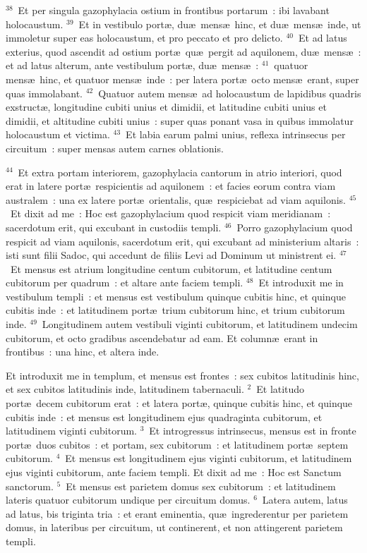 ${}^{38}$~Et per singula gazophylacia ostium in frontibus portarum~: ibi lavabant holocaustum.
${}^{39}$~Et in vestibulo port\ae , du\ae\ mens\ae\ hinc, et du\ae\ mens\ae\ inde, ut immoletur super eas holocaustum, et pro peccato et pro delicto.
${}^{40}$~Et ad latus exterius, quod ascendit ad ostium port\ae\ qu\ae\ pergit ad aquilonem, du\ae\ mens\ae~: et ad latus alterum, ante vestibulum port\ae , du\ae\ mens\ae~:
${}^{41}$~quatuor mens\ae\ hinc, et quatuor mens\ae\ inde~: per latera port\ae\ octo mens\ae\ erant, super quas immolabant.
${}^{42}$~Quatuor autem mens\ae\ ad holocaustum de lapidibus quadris exstruct\ae , longitudine cubiti unius et dimidii, et latitudine cubiti unius et dimidii, et altitudine cubiti unius~: super quas ponant vasa in quibus immolatur holocaustum et victima.
${}^{43}$~Et labia earum palmi unius, reflexa intrinsecus per circuitum~: super mensas autem carnes oblationis.


${}^{44}$~Et extra portam interiorem, gazophylacia cantorum in atrio interiori, quod erat in latere port\ae\ respicientis ad aquilonem~: et facies eorum contra viam australem~: una ex latere port\ae\ orientalis, qu\ae\ respiciebat ad viam aquilonis.
${}^{45}$~Et dixit ad me~: Hoc est gazophylacium quod respicit viam meridianam~: sacerdotum erit, qui excubant in custodiis templi.
${}^{46}$~Porro gazophylacium quod respicit ad viam aquilonis, sacerdotum erit, qui excubant ad ministerium altaris~: isti sunt filii Sadoc, qui accedunt de filiis Levi ad Dominum ut ministrent ei.
${}^{47}$~Et mensus est atrium longitudine centum cubitorum, et latitudine centum cubitorum per quadrum~: et altare ante faciem templi.
${}^{48}$~Et introduxit me in vestibulum templi~: et mensus est vestibulum quinque cubitis hinc, et quinque cubitis inde~: et latitudinem port\ae\ trium cubitorum hinc, et trium cubitorum inde.
${}^{49}$~Longitudinem autem vestibuli viginti cubitorum, et latitudinem undecim cubitorum, et octo gradibus ascendebatur ad eam. Et column\ae\ erant in frontibus~: una hinc, et altera inde.

\bchapter
\lettrine[lines=3,image=true,loversize=0.05,lraise=-0.03]{E}{}t introduxit me in templum, et mensus est frontes~: sex cubitos latitudinis hinc, et sex cubitos latitudinis inde, latitudinem tabernaculi.
${}^{2}$~Et latitudo port\ae\ decem cubitorum erat~: et latera port\ae , quinque cubitis hinc, et quinque cubitis inde~: et mensus est longitudinem ejus quadraginta cubitorum, et latitudinem viginti cubitorum.
${}^{3}$~Et introgressus intrinsecus, mensus est in fronte port\ae\ duos cubitos~: et portam, sex cubitorum~: et latitudinem port\ae\ septem cubitorum.
${}^{4}$~Et mensus est longitudinem ejus viginti cubitorum, et latitudinem ejus viginti cubitorum, ante faciem templi. Et dixit ad me~: Hoc est Sanctum sanctorum.
${}^{5}$~Et mensus est parietem domus sex cubitorum~: et latitudinem lateris quatuor cubitorum undique per circuitum domus.
${}^{6}$~Latera autem, latus ad latus, bis triginta tria~: et erant eminentia, qu\ae\ ingrederentur per parietem domus, in lateribus per circuitum, ut continerent, et non attingerent parietem templi.


